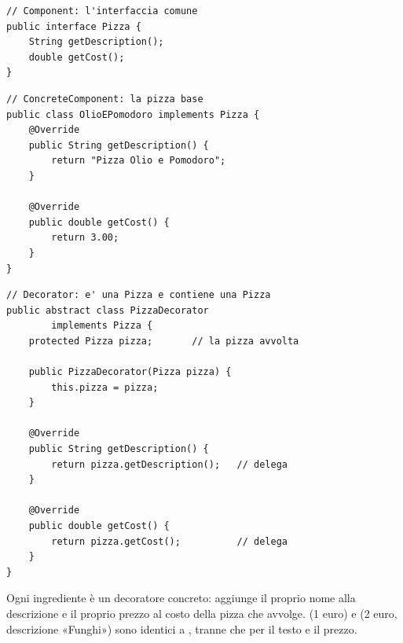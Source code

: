 \noindent\begin{minipage}[t]{0.49\textwidth}
\begin{lstlisting}[style=java, name=Pizza.java]
// Component: l'interfaccia comune
public interface Pizza {
    String getDescription();
    double getCost();
}
\end{lstlisting}
\begin{lstlisting}[style=java, name=OlioEPomodoro.java]
// ConcreteComponent: la pizza base
public class OlioEPomodoro implements Pizza {
    @Override
    public String getDescription() {
        return "Pizza Olio e Pomodoro";
    }

    @Override
    public double getCost() {
        return 3.00;
    }
}
\end{lstlisting}
\end{minipage}\hfill
\begin{minipage}[t]{0.49\textwidth}
\begin{lstlisting}[style=java, name=PizzaDecorator.java]
// Decorator: e' una Pizza e contiene una Pizza
public abstract class PizzaDecorator
        implements Pizza {
    protected Pizza pizza;       // la pizza avvolta

    public PizzaDecorator(Pizza pizza) {
        this.pizza = pizza;
    }

    @Override
    public String getDescription() {
        return pizza.getDescription();   // delega
    }

    @Override
    public double getCost() {
        return pizza.getCost();          // delega
    }
}
\end{lstlisting}
\end{minipage}

Ogni ingrediente è un decoratore concreto: aggiunge il proprio nome alla descrizione e il proprio prezzo al costo della pizza
che avvolge.  (1 euro) e  (2 euro, descrizione «Funghi») sono identici a ,
tranne che per il testo e il prezzo.

